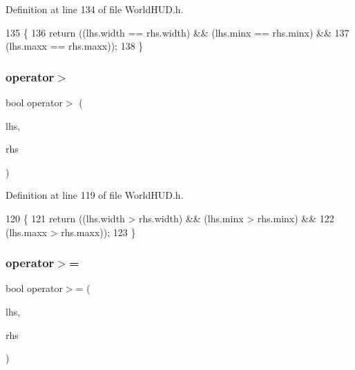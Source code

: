 Definition at line 134 of file World\+H\+U\+D.\+h.


\begin{DoxyCode}
135     \{
136       \textcolor{keywordflow}{return} ((lhs.width == rhs.width) && (lhs.minx == rhs.minx) &&
137               (lhs.maxx == rhs.maxx));
138     \}
\end{DoxyCode}
\mbox{\label{structnjli_1_1_j_l_i_text_row_a7a98698f509414d766a1bca5fe3c804e}} 
\subsubsection{\texorpdfstring{operator$>$}{operator>}}
{\footnotesize\ttfamily bool operator$>$ (\begin{DoxyParamCaption}\item[{const \mbox{\hyperlink{structnjli_1_1_j_l_i_text_row}{J\+L\+I\+Text\+Row}} \&}]{lhs,  }\item[{const \mbox{\hyperlink{structnjli_1_1_j_l_i_text_row}{J\+L\+I\+Text\+Row}} \&}]{rhs }\end{DoxyParamCaption})\hspace{0.3cm}{\ttfamily [friend]}}



Definition at line 119 of file World\+H\+U\+D.\+h.


\begin{DoxyCode}
120     \{
121       \textcolor{keywordflow}{return} ((lhs.width > rhs.width) && (lhs.minx > rhs.minx) &&
122               (lhs.maxx > rhs.maxx));
123     \}
\end{DoxyCode}
\mbox{\label{structnjli_1_1_j_l_i_text_row_a93d67945dad8ea8ef959df9acefcc64e}} 
\subsubsection{\texorpdfstring{operator$>$=}{operator>=}}
{\footnotesize\ttfamily bool operator$>$= (\begin{DoxyParamCaption}\item[{const \mbox{\hyperlink{structnjli_1_1_j_l_i_text_row}{J\+L\+I\+Text\+Row}} \&}]{lhs,  }\item[{const \mbox{\hyperlink{structnjli_1_1_j_l_i_text_row}{J\+L\+I\+Text\+Row}} \&}]{rhs }\end{DoxyParamCaption})\hspace{0.3cm}{\ttfamily [friend]}}



